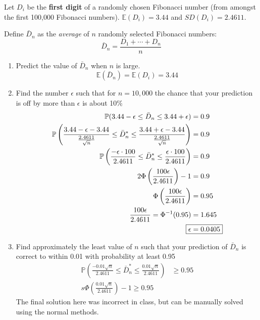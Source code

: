 \documentclass[titlepage, 12pt, leqno]{article}
\begin{document}
\begin{ex}
    Let $D_i$ be the \textbf{first digit} of a randomly chosen Fibonacci number
    (from amongst the first 100,000 Fibonacci numbers). $ \mathbb{E}(D_i) = 3.44$
    and $SD(D_i) = 2.4611$.
    \vspace{10px}

    Define $ \bar D_n$ as the \textit{average} of $n$ randomly selected Fibonacci
    numbers:
    \[
    \bar D_n = \frac{D_1 + \cdots + D_n}{n}
    \]
    \begin{enumerate}
        \item Predict the value of $ \bar D_n$ when $n$ is large.
            \[
                \mathbb{E}( \bar D_n) = \mathbb{E}(D_i) = \boxed{3.44}
            \]
        \item Find the number $\epsilon$ such that for $n=10,000$ the chance
            that your prediction is off by more than $\epsilon$ is about 10\%
           \begin{align*}
               \mathbb{P}(3.44-\epsilon \le \bar D_n \le 3.44+\epsilon) &= 0.9 \\
               \mathbb{P}\left(\frac{3.44-\epsilon-3.44}{\frac{2.4611}{\sqrt{n}}}
                   \le \bar D_n^* \le
                   \frac{3.44+\epsilon-3.44}{\frac{2.4611}{\sqrt{n}}}\right) 
                                                                        &= 0.9\\
               \mathbb{P}\left(\frac{-\epsilon \cdot 100}{2.4611}\le\bar D_n^* \le
           \frac{\epsilon \cdot 100}{2.4611}\right) &= 0.9 \\
           2\Phi\left(\frac{100\epsilon}{2.4611}\right) - 1 &= 0.9 \\
           \Phi\left(\frac{100\epsilon}{2.4611}\right) &= 0.95 \\
           \frac{100\epsilon}{2.4611} = \Phi^{-1}(0.95) &= 1.645 \\
           \Aboxed{\epsilon &= 0.0405} 
           \end{align*}

        \item Find approximately the least value of $n$ such that your prediction
            of $ \bar D_n$ is correct to within 0.01 with probability at least
            0.95
           \begin{align*}
               \mathbb{P}\left(\frac{-0.01\sqrt{n}}{2.4611} \le \bar D_n^* \le
                   \frac{0.01\sqrt{n}}{2.4611}\right) &\ge 0.95 \\
                   s\Phi\left(\frac{0.01\sqrt{n}}{2.4611}\right) -1 \ge 0.95
           \end{align*}
           The final solution here was incorrect in class, but can be manually
           solved using the normal methods.


\end{enumerate}
\end{ex}
\end{document}
